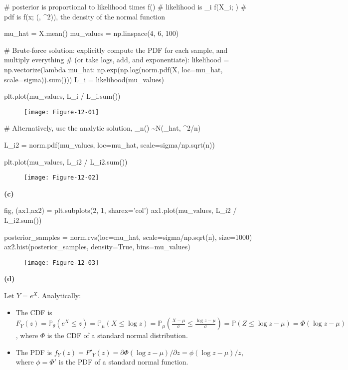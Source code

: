 \begin{python}
# posterior is proportional to likelihood times f(\mu)
# likelihood is \prod_{i} f(X_{i}; \mu)
# pdf is f(x; (\mu, \sigma^{2})), the density of the normal function

mu_hat = X.mean()
mu_values = np.linspace(4, 6, 100)
\end{python}

\begin{python}
# Brute-force solution: explicitly compute the PDF for each sample, and multiply everything 
# (or take logs, add, and exponentiate):
likelihood = np.vectorize(lambda mu_hat: np.exp(np.log(norm.pdf(X, loc=mu_hat, scale=sigma)).sum()))
L_{i} = likelihood(mu_values)

plt.plot(mu_values, L_{i} / L_{i}.sum())
\end{python}

\begin{figure}[H]
\centering
\texttt{[image: Figure-12-01]}
\end{figure}

\begin{python}
# Alternatively, use the analytic solution, _{n}(\mu) \sim N(\mu_hat, \sigma^{2}/n)

L_{i}2 = norm.pdf(mu_values, loc=mu_hat, scale=sigma/np.sqrt(n))

plt.plot(mu_values, L_{i}2 / L_{i}2.sum())
\end{python}


\begin{figure}[H]
\centering
\texttt{[image: Figure-12-02]}
\end{figure}

\textbf{(c)}

\begin{python}
fig, (ax1,ax2) = plt.subplots(2, 1, sharex='col')
ax1.plot(mu_values, L_{i}2 / L_{i}2.sum())

posterior_samples = norm.rvs(loc=mu_hat, scale=sigma/np.sqrt(n), size=1000)
ax2.hist(posterior_samples, density=True, bins=mu_values)
\end{python}

\begin{figure}[H]
\centering
\texttt{[image: Figure-12-03]}
\end{figure}

\textbf{(d)}

Let \(Y = e^X\). Analytically:

\begin{itemize}[tightlist]
\item
  The CDF is
  \(F_Y(z) = \mathbb{P}_\theta(e^X \leq z) = \mathbb{P}_\mu(X \leq \log z) = \mathbb{P}_\mu \left( \frac{X - \mu}{\sigma} \leq \frac{\log z - \mu}{\sigma} \right) = \mathbb{P}(Z \leq \log z - \mu) = \Phi(\log z - \mu)\),
  where \(\Phi\) is the CDF of a standard normal distribution.
\item
  The PDF is
  \(f_Y(z) = F'_Y(z) = \partial \Phi(\log z - \mu) / \partial z = \phi(\log z - \mu) / z\),
  where \(\phi = \Phi'\) is the PDF of a standard normal function.
\end{itemize}

